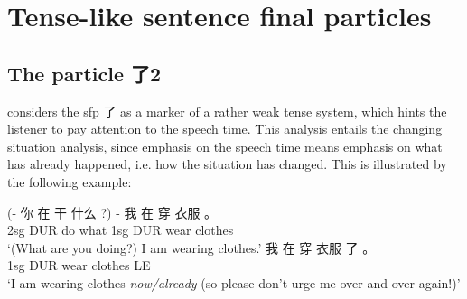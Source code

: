 \documentclass[../main.tex]{subfiles}
\begin{document}
\section{Tense-like sentence final particles}

\subsection{The particle 了2}\label{sec:sfp-le}

\citep[]{meiguang2018} considers the \ac{sfp} 了 as a marker of a rather weak tense system,
which hints the listener to pay attention to the speech time. 
This analysis entails the changing situation analysis, 
since emphasis on the speech time means emphasis on what has already happened, i.e. 
how the situation has changed.
This is illustrated by the following example: 
\begin{exe}
    \ex \begin{xlist}
        \ex \gll (- 你 在 干 什么 ?) - 我 在 穿 衣服 。 \\
        {} 2sg DUR do what {} {} 1sg DUR wear clothes \\
        \glt `(What are you doing?) I am wearing clothes.' 
        \ex \gll 我 在 穿 衣服 了 。 \\
        1sg DUR wear clothes LE \\
        \glt `I am wearing clothes \emph{now/already} (so please don't urge me over and over again!)'
    \end{xlist}
\end{exe}
\end{document}
